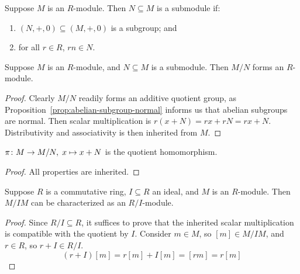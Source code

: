 \begin{definition}
    Suppose \(M\) is an \(R\)-module.
    Then \(N \subseteq M\) is a submodule if:
    \begin{enumerate}[label={(\roman*)}, itemsep=0mm]
        \item \((N,+,0) \subseteq (M,+,0)\) is a subgroup; and
        \item for all \(r \in R\), \(rn \in N\).
    \end{enumerate}
\end{definition}
\begin{lemma}
    Suppose \(M\) is an \(R\)-module,
    and \(N \subseteq M\) is a submodule.
    Then \(M/N\) forms an \(R\)-module.
\end{lemma}
\begin{proof}
    Clearly \(M/N\) readily forms an additive quotient group,
    as Proposition~\ref{prop:abelian-subgroup-normal} informs us that abelian subgroups are normal.
    Then scalar multiplication is \(r(x+N) = rx + rN = rx + N\).
    Distributivity and associativity is then inherited from \(M\).
\end{proof}
\begin{corollary}
    \(\pi\colon M\to M/N,\;x\mapsto x+N\) is the quotient homomorphism.
\end{corollary}
\begin{proof}
    All properties are inherited.
\end{proof}
\begin{proposition}\label{prop:quotient-ring-module}
    Suppose \(R\) is a commutative ring, \(I \subseteq R\) an ideal,
    and \(M\) is an \(R\)-module.
    Then \(M/IM\) can be characterized as an \(R/I\)-module.
\end{proposition}
\begin{proof}
    Since \(R/I \subseteq R\),
    it suffices to prove that the inherited scalar multiplication
    is compatible with the quotient by \(I\).
    Consider \(m \in M\), so \([m] \in M/IM\),
    and \(r \in R\), so \(r+I \in R/I\).
    \begin{equation*}
        (r+I)[m] = r[m] + I[m] = [rm] = r[m]
    \end{equation*}
\end{proof}

